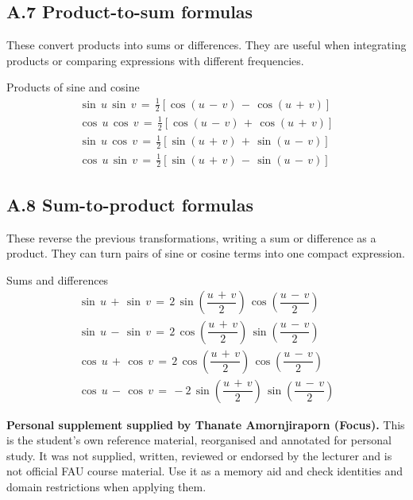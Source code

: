 \documentclass[11pt]{article}
\begin{document}
\begin{keepsection}
\section{A.7 Product-to-sum formulas}

These convert products into sums or differences. They are useful when integrating products or comparing expressions with different frequencies.

\begin{equationcard}{Products of sine and cosine}
\[ \begin{gathered} \sin \, {u}\, \sin \, {v}\, =\, \tfrac{1}{2}[\cos ({u}\, -\, {v})\, -\, \cos ({u}\, +\, {v})] \\ \cos \, {u}\, \cos \, {v}\, =\, \tfrac{1}{2}[\cos ({u}\, -\, {v})\, +\, \cos ({u}\, +\, {v})] \\ \sin \, {u}\, \cos \, {v}\, =\, \tfrac{1}{2}[\sin ({u}\, +\, {v})\, +\, \sin ({u}\, -\, {v})] \\ \cos \, {u}\, \sin \, {v}\, =\, \tfrac{1}{2}[\sin ({u}\, +\, {v})\, -\, \sin ({u}\, -\, {v})] \end{gathered} \]
\end{equationcard}
\end{keepsection}

\begin{keepsection}
\section{A.8 Sum-to-product formulas}

These reverse the previous transformations, writing a sum or difference as a product. They can turn pairs of sine or cosine terms into one compact expression.

\begin{equationcard}{Sums and differences}
\[ \begin{gathered} \sin \, {u}\, +\, \sin \, {v}\, =\, 2\, \sin \left(\dfrac{{u}\, +\, {v}}{2}\right)\, \cos \left(\dfrac{{u}\, -\, {v}}{2}\right) \\ \sin \, {u}\, -\, \sin \, {v}\, =\, 2\, \cos \left(\dfrac{{u}\, +\, {v}}{2}\right)\, \sin \left(\dfrac{{u}\, -\, {v}}{2}\right) \\ \cos \, {u}\, +\, \cos \, {v}\, =\, 2\, \cos \left(\dfrac{{u}\, +\, {v}}{2}\right)\, \cos \left(\dfrac{{u}\, -\, {v}}{2}\right) \\ \cos \, {u}\, -\, \cos \, {v}\, =\, -2\, \sin \left(\dfrac{{u}\, +\, {v}}{2}\right)\, \sin \left(\dfrac{{u}\, -\, {v}}{2}\right) \end{gathered} \]
\end{equationcard}
\end{keepsection}


\vfill{\small \textbf{Personal supplement supplied by Thanate Amornjiraporn (Focus).} This is the student's own reference material, reorganised and annotated for personal study. It was not supplied, written, reviewed or endorsed by the lecturer and is not official FAU course material. Use it as a memory aid and check identities and domain restrictions when applying them.}
\end{document}
